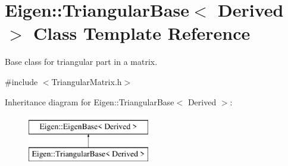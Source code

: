 \hypertarget{class_eigen_1_1_triangular_base}{}\section{Eigen\+::Triangular\+Base$<$ Derived $>$ Class Template Reference}
\label{class_eigen_1_1_triangular_base}


Base class for triangular part in a matrix.  




{\ttfamily \#include $<$Triangular\+Matrix.\+h$>$}

Inheritance diagram for Eigen\+::Triangular\+Base$<$ Derived $>$\+:\begin{figure}[H]
\begin{center}
\leavevmode
\includegraphics[height=2.000000cm]{class_eigen_1_1_triangular_base}
\end{center}
\end{figure}
